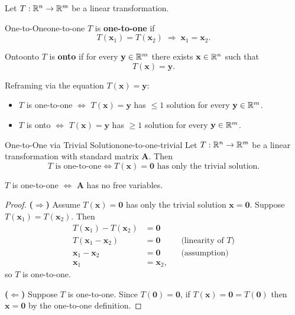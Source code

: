 Let $T: \mathbb{R}^n \to \mathbb{R}^m$ be a linear transformation.

\begin{definition}{One-to-One}{one-to-one}
  $T$ is \textbf{one-to-one} if
  \[
    T(\mathbf{x}_1) = T(\mathbf{x}_2) \;\Longrightarrow\; \mathbf{x}_1 = \mathbf{x}_2.
  \]
\end{definition}

\begin{definition}{Onto}{onto}
  $T$ is \textbf{onto} if for every $\mathbf{y} \in \mathbb{R}^m$ there exists $\mathbf{x} \in \mathbb{R}^n$ such that
  \[
    T(\mathbf{x}) = \mathbf{y}.
  \]
\end{definition}

\begin{remark}
  Reframing via the equation $T(\mathbf{x}) = \mathbf{y}$:
  \begin{itemize}
    \item $T$ is one-to-one $\iff$ $T(\mathbf{x}) = \mathbf{y}$ has $\leq 1$ solution for every $\mathbf{y} \in \mathbb{R}^m$.
    \item $T$ is onto $\iff$ $T(\mathbf{x}) = \mathbf{y}$ has $\geq 1$ solution for every $\mathbf{y} \in \mathbb{R}^m$.
  \end{itemize}
\end{remark}

\begin{theorem}{One-to-One via Trivial Solution}{one-to-one-trivial}
  Let $T: \mathbb{R}^n \to \mathbb{R}^m$ be a linear transformation with standard matrix $\mathbf{A}$. Then
  \[
    T \text{ is one-to-one} \iff T(\mathbf{x}) = \mathbf{0} \text{ has only the trivial solution}.
  \]
\end{theorem}

\begin{remark}
  $T$ is one-to-one $\iff$ $\mathbf{A}$ has no free variables.
\end{remark}

\begin{proof}
  \textbf{($\Rightarrow$)} Assume $T(\mathbf{x}) = \mathbf{0}$ has only the trivial solution $\mathbf{x} = \mathbf{0}$. Suppose $T(\mathbf{x}_1) = T(\mathbf{x}_2)$. Then
  \begin{align*}
    T(\mathbf{x}_1) - T(\mathbf{x}_2) & = \mathbf{0}                                         \\
    T(\mathbf{x}_1 - \mathbf{x}_2)    & = \mathbf{0}    &  & \text{(linearity of } T\text{)} \\
    \mathbf{x}_1 - \mathbf{x}_2       & = \mathbf{0}    &  & \text{(assumption)}             \\
    \mathbf{x}_1                      & = \mathbf{x}_2,
  \end{align*}
  so $T$ is one-to-one.

  \textbf{($\Leftarrow$)} Suppose $T$ is one-to-one. Since $T(\mathbf{0}) = \mathbf{0}$, if $T(\mathbf{x}) = \mathbf{0} = T(\mathbf{0})$ then $\mathbf{x} = \mathbf{0}$ by the one-to-one definition.
\end{proof}


